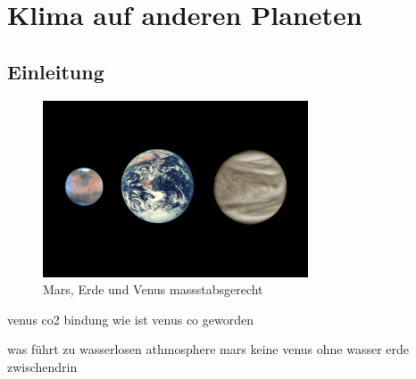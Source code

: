 %
%
%
\chapter{Klima auf anderen Planeten\label{chapter:thema}}
\begin{refsection}

\section{Einleitung}

\begin{figure}
  
	\centering
	\includegraphics[width=0.7\textwidth]{Pictures/planets.jpg}
	\caption{Mars, Erde und Venus massstabsgerecht}
\end{figure}





venus co2 bindung
wie ist venus co geworden


was führt zu wasserlosen athmosphere
mars keine
venus ohne wasser
erde zwischendrin


\end{refsection}
